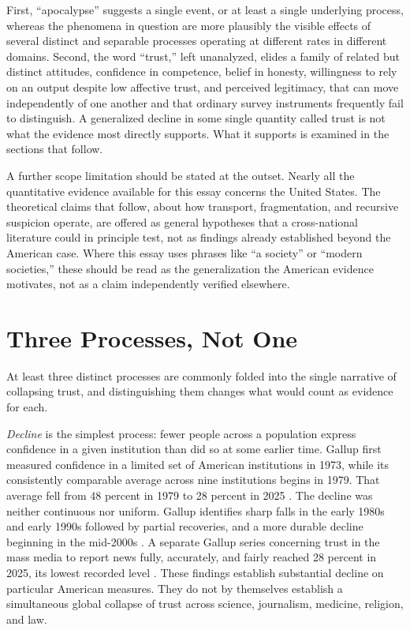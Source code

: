 \documentclass[11pt]{article}
\begin{document}
First, ``apocalypse'' suggests a single event, or at least a single underlying process, whereas the phenomena in question are more plausibly the visible effects of several distinct and separable processes operating at different rates in different domains. Second, the word ``trust,'' left unanalyzed, elides a family of related but distinct attitudes, confidence in competence, belief in honesty, willingness to rely on an output despite low affective trust, and perceived legitimacy, that can move independently of one another and that ordinary survey instruments frequently fail to distinguish. A generalized decline in some single quantity called trust is not what the evidence most directly supports. What it supports is examined in the sections that follow.

A further scope limitation should be stated at the outset. Nearly all the quantitative evidence available for this essay concerns the United States. The theoretical claims that follow, about how transport, fragmentation, and recursive suspicion operate, are offered as general hypotheses that a cross-national literature could in principle test, not as findings already established beyond the American case. Where this essay uses phrases like ``a society'' or ``modern societies,'' these should be read as the generalization the American evidence motivates, not as a claim independently verified elsewhere.

\section{Three Processes, Not One}

At least three distinct processes are commonly folded into the single narrative of collapsing trust, and distinguishing them changes what would count as evidence for each.

\emph{Decline} is the simplest process: fewer people across a population express confidence in a given institution than did so at some earlier time. Gallup first measured confidence in a limited set of American institutions in 1973, while its consistently comparable average across nine institutions begins in 1979. That average fell from 48 percent in 1979 to 28 percent in 2025 \citep{gallup2025institutions,gallup2026}. The decline was neither continuous nor uniform. Gallup identifies sharp falls in the early 1980s and early 1990s followed by partial recoveries, and a more durable decline beginning in the mid-2000s \citep{gallup2026}. A separate Gallup series concerning trust in the mass media to report news fully, accurately, and fairly reached 28 percent in 2025, its lowest recorded level \citep{gallup2025media}. These findings establish substantial decline on particular American measures. They do not by themselves establish a simultaneous global collapse of trust across science, journalism, medicine, religion, and law.
\end{document}
